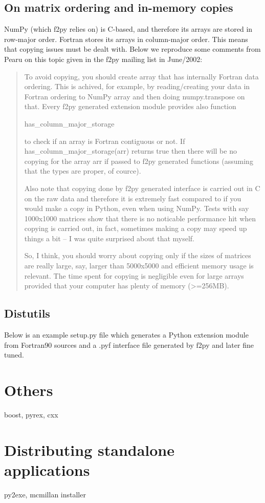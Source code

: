 \subsection{On matrix ordering and in-memory copies}

NumPy (which f2py relies on) is C-based, and therefore its arrays
are stored in row-major order. Fortran stores its arrays in column-major
order. This means that copying issues must be dealt with. Below we
reproduce some comments from Pearu on this topic given in the f2py
mailing list in June/2002: 

\begin{quote}
To avoid copying, you should create array that has internally Fortran
data ordering. This is achived, for example, by reading/creating your
data in Fortran ordering to NumPy array and then doing numpy.transpose
on that. Every f2py generated extension module provides also function 

has\_column\_major\_storage

to check if an array is Fortran contiguous or not. If has\_column\_major\_storage(arr)
returns true then there will be no copying for the array arr if passed
to f2py generated functions (assuming that the types are proper, of
cource).

Also note that copying done by f2py generated interface is carried
out in C on the raw data and therefore it is extremely fast compared
to if you would make a copy in Python, even when using NumPy. Tests
with say 1000x1000 matrices show that there is no noticable performance
hit when copying is carried out, in fact, sometimes making a copy
may speed up things a bit -- I was quite surprised about that myself.

So, I think, you should worry about copying only if the sizes of matrices
are really large, say, larger than 5000x5000 and efficient memory
usage is relevant. The time spent for copying is negligible even for
large arrays provided that your computer has plenty of memory (>=256MB).
\end{quote}

\subsection{Distutils}

Below is an example setup.py file which generates a Python extension
module from Fortran90 sources and a .pyf interface file generated
by f2py and later fine tuned. 




\section{Others}

boost, pyrex, cxx


\section[Standalone applications]{Distributing standalone applications}

py2exe, mcmillan installer
